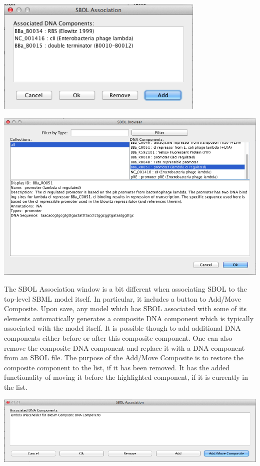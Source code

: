 \documentclass[titlepage,11pt]{article}
\begin{document}
\begin{center}
\includegraphics[width=100mm]{screenshots/AssociateSBOL}
\end{center}

\begin{center}
\includegraphics[width=160mm]{screenshots/AssociateSBOLBrowser}
\end{center}

The SBOL Association window is a bit different when associating SBOL to the top-level SBML model itself.  In particular, it includes a button to Add/Move Composite.  Upon save, any model which has SBOL associated with some of its elements automatically generates a composite DNA component which is typically associated with the model itself.  It is possible though to add additional DNA components either before or after this composite component.  One can also remove the composite DNA component and replace it with a DNA component from an SBOL file.  The purpose of the Add/Move Composite is to restore the composite component to the list, if it has been removed.  It has the added functionality of moving it before the highlighted component, if it is currently in the list.

\begin{center}
\includegraphics[width=160mm]{screenshots/AssociateSBOLModel}
\end{center}
\end{document}
